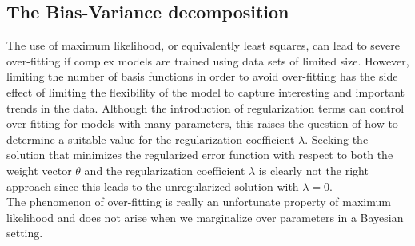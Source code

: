 \documentclass[twoside]{article}
\begin{document}
\subsection{The Bias-Variance decomposition}
The use of maximum likelihood, or equivalently least squares, can lead to severe over-fitting if complex models are trained using data sets of limited size. However, limiting the number of basis functions in order to avoid over-fitting has the side effect of limiting the flexibility of the model to capture interesting and important trends in the data. Although the introduction of regularization terms can control over-fitting for models with many parameters, this raises the question of how to determine a suitable value for the regularization coefficient $\lambda$. Seeking the solution that minimizes the regularized error function with respect to both the weight vector $\theta$ and the regularization coefficient $\lambda$ is clearly not the right approach since this leads to the unregularized solution with $\lambda = 0$.\\
The phenomenon of over-fitting is really an unfortunate property of maximum likelihood and does not arise when we marginalize over parameters in a Bayesian setting.\medskip
\end{document}
